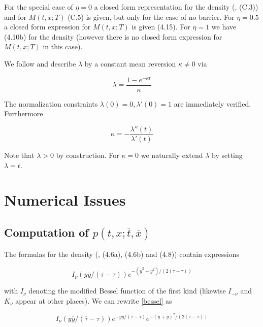 \documentclass{amsart}
\theoremstyle{plain}
\numberwithin{equation}{section}
\begin{document}
For the special case of $\eta=0$ a closed form representation for the density (\cite{betaeta}, (C.3)) and for $M(t,x;T)$ (C.5) is given, but only for the case of no barrier. For $\eta=0.5$ a closed form expression for $M(t,x;T)$ is given (4.15). For $\eta=1$ we have (4.10b) for the density (however there is no closed form expression for $M(t,x;T)$ in this case).

We follow \cite{piterbarg} and describe $\lambda$ by a constant mean reversion $\kappa \neq 0$ via

\begin{equation}
\lambda = \frac{1 - e^{-\kappa t}}{\kappa}
\end{equation}

The normalization constraints $\lambda(0)=0, \lambda'(0)=1$ are immediately verified. Furthermore

\begin{equation}
\kappa = -\frac{\lambda''(t)}{\lambda'(t)}
\end{equation}

Note that $\lambda > 0$ by construction. For $\kappa=0$ we naturally extend $\lambda$ by setting $\lambda = t$.

\section{Numerical Issues}

\subsection{Computation of $p(t,x;\overline{t},\overline{x})$}

The formulas for the density (\cite{betaeta}, (4.6a), (4.6b) and (4.8)) contain expressions

\begin{equation}\label{bessel}
I_\nu(y\overline{y}/(\overline{\tau}-\tau)) e^{-(\overline{y}^2+y^2)/(2(\overline{\tau}-\tau))}
\end{equation}

with $I_\nu$ denoting the modified Bessel function of the first kind (likewise $I_{-\nu}$ and $K_\nu$ appear at other places). We can rewrite \ref{bessel} as

\begin{equation}
I_\nu(y\overline{y}/(\overline{\tau}-\tau))e^{-y\overline{y}/(\overline{\tau}-\tau)} e^{-(\overline{y}+y)^2/(2(\overline{\tau}-\tau))}
\end{equation}
\end{document}
